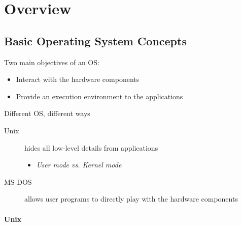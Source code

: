 \mode*
{}

\section{Overview}

\subsection{Basic Operating System Concepts}

\begin{frame}
  \begin{minipage}{.7\linewidth}
    \begin{block}{Two main objectives of an OS:}
      \begin{itemize}
      \item Interact with the hardware components
      \item Provide an execution environment to the applications
      \end{itemize}
    \end{block}
    \begin{block}{Different OS, different ways}
      \begin{description}
      \item[Unix] hides all low-level details from applications
        \begin{itemize}
        \item[] \emph{User mode vs. Kernel mode}
        \end{itemize}
      \item[MS-DOS] allows user programs to directly play with the hardware components
      \end{description}
    \end{block}
  \end{minipage}\hfill
  \begin{minipage}{.28\linewidth}
    \begin{center}
       
    \end{center}
  \end{minipage}
\end{frame}

\paragraph{Unix}

